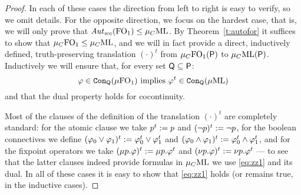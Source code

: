 \begin{proof}
In each of these cases the direction from left to right is easy to verify,
so we omit details.
For the opposite direction, we focus on the hardest case, that is, we will 
only prove that $\mathit{Aut}_{wc}(\mathrm{FO}_1) \leq \mu_{C}\mathrm{ML}$.
By Theorem~\ref{t:autofor} it suffices to show that $\mu_{C}\mathrm{FO}_1 \leq \mu_{C}\mathrm{ML}$,
and we will in fact provide a direct, inductively defined, truth-preserving 
translation $(\cdot)^{t}$ from $\mu_{C}\mathrm{FO}_1(\mathsf{P})$ to $\mu_{C}\mathrm{ML}(\mathsf{P})$.
Inductively we will ensure that, for every set $\mathsf{Q} \subseteq \mathsf{P}$:
\begin{equation}
\label{eq:zz1}
\phi \in \cont{\mu\ofo}{\qprop} %
\text{ implies } \phi^{t} \in 
\cont{\muML}{\qprop} %
\end{equation}
and that the dual property holds for cocontinuity.

Most of the clauses of the definition of the translation $(\cdot)^{t}$ are 
completely standard: for the atomic clause we take $p^{t} \mathrel{:=} p$ and
$(\neg p)^{t} \mathrel{:=} \neg p$, for the boolean connectives we define 
$(\varphi_{0}\lor\varphi_{1})^{t} \mathrel{:=} \varphi_{0}^{t} \lor \varphi_{1}^{t}$ and 
$(\varphi_{0}\land\varphi_{1})^{t} \mathrel{:=} \varphi_{0}^{t} \land \varphi_{1}^{t}$, and 
for the fixpoint operators we take $(\mu p. \varphi)^{t} \mathrel{:=} \mu p. \varphi^{t}$ 
and $(\nu p. \varphi)^{t} \mathrel{:=} \nu p. \varphi^{t}$ ---
to see that the latter clauses indeed provide formulas in $\mu_{C}\mathrm{ML}$ we use
\eqref{eq:zz1} and its dual.
In all of these cases it is easy to show that \eqref{eq:zz1} holds (or remains
true, in the inductive cases).


\end{proof}
